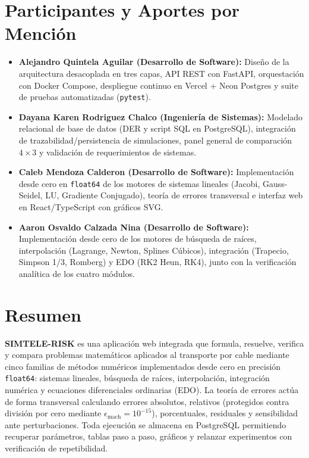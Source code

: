 \documentclass[11pt,a4paper]{article}
\begin{document}
\tableofcontents
\newpage

\section{Participantes y Aportes por Mención}
\begin{itemize}
    \item \textbf{Alejandro Quintela Aguilar (Desarrollo de Software):} Diseño de la arquitectura desacoplada en tres capas, API REST con FastAPI, orquestación con Docker Compose, despliegue continuo en Vercel + Neon Postgres y suite de pruebas automatizadas (\texttt{pytest}).
    \item \textbf{Dayana Karen Rodriguez Chalco (Ingeniería de Sistemas):} Modelado relacional de base de datos (DER y script SQL en PostgreSQL), integración de trazabilidad/persistencia de simulaciones, panel general de comparación $4\times 3$ y validación de requerimientos de sistemas.
    \item \textbf{Caleb Mendoza Calderon (Desarrollo de Software):} Implementación desde cero en \texttt{float64} de los motores de sistemas lineales (Jacobi, Gauss-Seidel, LU, Gradiente Conjugado), teoría de errores transversal e interfaz web en React/TypeScript con gráficos SVG.
    \item \textbf{Aaron Osvaldo Calzada Nina (Desarrollo de Software):} Implementación desde cero de los motores de búsqueda de raíces, interpolación (Lagrange, Newton, Splines Cúbicos), integración (Trapecio, Simpson 1/3, Romberg) y EDO (RK2 Heun, RK4), junto con la verificación analítica de los cuatro módulos.
\end{itemize}

\section{Resumen}
\textbf{SIMTELE-RISK} es una aplicación web integrada que formula, resuelve, verifica y compara problemas matemáticos aplicados al transporte por cable mediante cinco familias de métodos numéricos implementados desde cero en precisión \texttt{float64}: sistemas lineales, búsqueda de raíces, interpolación, integración numérica y ecuaciones diferenciales ordinarias (EDO). La teoría de errores actúa de forma transversal calculando errores absolutos, relativos (protegidos contra división por cero mediante $\epsilon_{\text{mach}}=10^{-15}$), porcentuales, residuales y sensibilidad ante perturbaciones. Toda ejecución se almacena en PostgreSQL permitiendo recuperar parámetros, tablas paso a paso, gráficos y relanzar experimentos con verificación de repetibilidad.
\end{document}
